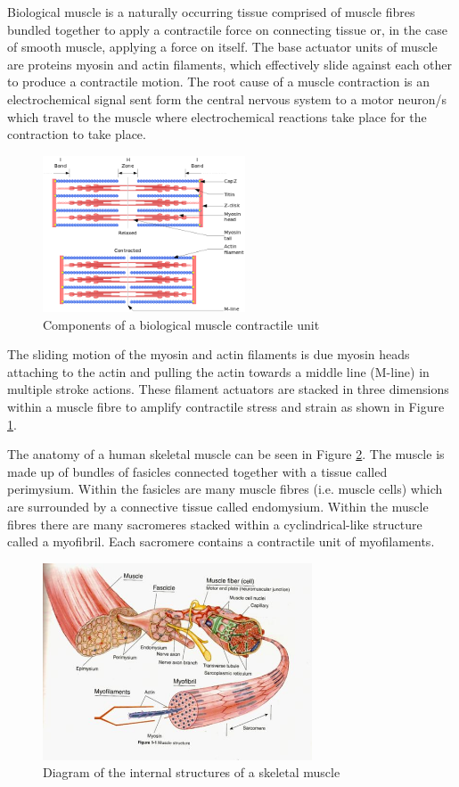 Biological muscle is a naturally occurring tissue comprised of muscle fibres bundled together to apply a contractile force on connecting tissue or, in the case of smooth muscle, applying a force on itself. The base actuator units of muscle are proteins myosin and actin filaments, which effectively slide against each other to produce a contractile motion. The root cause of a muscle contraction is an electrochemical signal sent form the central nervous system to a motor neuron/s which travel to the muscle where electrochemical reactions take place for the contraction to take place.
\begin{figure}[h!]
  \centering
  \includegraphics[width=6cm]{Figures/300px-Sarcomere.png}
  \caption{Components of a biological muscle contractile unit \citep{Richfield2014}}
  \label{fig:muscle_unit}
\end{figure}
The sliding motion of the myosin and actin filaments is due myosin heads attaching to the actin and pulling the actin towards a middle line (M-line) in multiple stroke actions. These filament actuators are stacked in three dimensions within a muscle fibre to amplify contractile stress and strain as shown in Figure \ref{fig:muscle_unit}.

The anatomy of a human skeletal muscle can be seen in Figure \ref{fig:muscle_parts}. The muscle is made up of bundles of fasicles connected together with a tissue called perimysium. Within the fasicles are many muscle fibres (i.e. muscle cells) which are surrounded by a connective tissue called endomysium. Within the muscle fibres there are many sacromeres stacked within a cyclindrical-like structure called a myofibril. Each sacromere contains a contractile unit of myofilaments. 
\begin{figure}[h!]
  \centering
  \includegraphics[width=8cm]{Figures/muscle structure.jpg}
  \caption{Diagram of the internal structures of a skeletal muscle\citep{Spina2014}}
  \label{fig:muscle_parts}
\end{figure}



